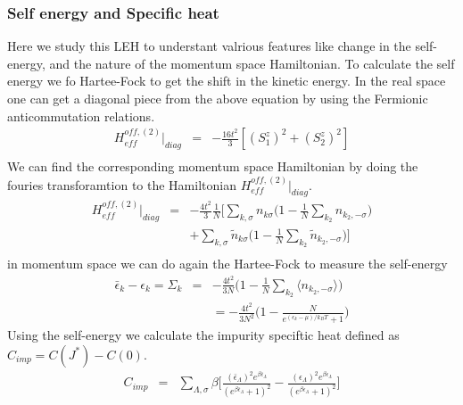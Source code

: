 \documentclass[reprint,prb,superscriptaddress]{revtex4-2}
\begin{document}
\subsubsection{Self energy and Specific heat}
Here we study this LEH to understant valrious features like change in the self-energy, and the nature of the momentum space Hamiltonian. To calculate the self energy we fo Hartee-Fock to get the shift in the kinetic energy.
In the real space one can get a diagonal piece from the above equation by using the Fermionic anticommutation relations.
\begin{eqnarray}
H_{eff}^{off,(2)} |_{diag} &=& -\frac{16t^2}{3} [ (S_1^z)^2+ (S_2^z)^2 ]  \nonumber\\
\end{eqnarray}
We can find the corresponding momentum space Hamiltonian by doing the fouries transforamtion to the Hamiltonian $H_{eff}^{off,(2)} |_{diag} $.
\begin{eqnarray}
H_{eff}^{off,(2)} |_{diag}&=& -\frac{4t^2}{3} \frac{1}{N} \bigg[ \displaystyle\sum_{k,\sigma} n_{k\sigma}\bigg(1-\frac{1}{N} \displaystyle\sum_{k_2}  n_{k_2,-\sigma} \bigg) \nonumber\\
&&+ \displaystyle\sum_{k,\sigma} \tilde{n}_{k\sigma}\bigg( 1-\frac{1}{N} \displaystyle\sum_{ k_2} \tilde{n}_{k_2,-\sigma} \bigg) \bigg] \nonumber\\
\end{eqnarray}
in momentum space we can do again the Hartee-Fock to measure the self-energy
\begin{eqnarray}
\bar{\epsilon}
_k-\epsilon_k=\Sigma_k &=& -\frac{4t^2}{3N} \bigg(1-\frac{1}{N} \displaystyle\sum_{k_2}  \langle n_{k_2,-\sigma} \rangle \bigg) \nonumber\\
&&= -\frac{4t^2}{3N^2}\bigg(1-\frac{N}{e^{(\epsilon_k-\mu)/k_BT}+1}\bigg)
\label{eq:self-energy-NFL}
\end{eqnarray}
Using the self-energy we calculate the impurity speciftic heat defined as $C_{imp}=C(J^*)-C(0)$.
\begin{eqnarray}
C_{imp} &=& \sum_{\Lambda,\sigma} \beta \bigg[ \frac{(\bar{\epsilon}_{\Lambda})^2 e^{\beta \bar{\epsilon}_{\Lambda}}}{( e^{\beta \bar{\epsilon}_{\Lambda}} +1)^2}  -\frac{({\epsilon}_{\Lambda})^2 e^{\beta {\epsilon}_{\Lambda}}}{( e^{\beta {\epsilon}_{\Lambda}} +1)^2} \bigg]
\end{eqnarray}
\end{document}
